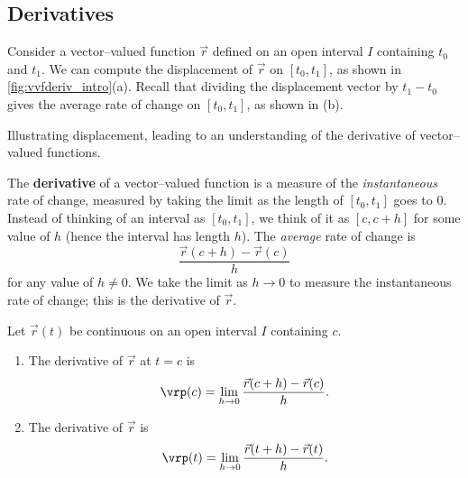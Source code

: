 \subsection*{Derivatives}

Consider a vector--valued function $\vec r$ defined on an open interval $I$ containing $t_0$ and $t_1$. We can compute the displacement of $\vec r$ on $[t_0,t_1]$, as shown in \autoref{fig:vvfderiv_intro}(a). Recall that dividing the displacement vector by $t_1-t_0$ gives the average rate of change on $[t_0,t_1]$, as shown in (b).

\begin{lxfigure}
\caption{Illustrating displacement, leading to an understanding of the derivative of vector--valued functions.}
\label{fig:vvfderiv_intro}
\end{lxfigure}

The \textbf{derivative} of a vector--valued function is a measure of the \emph{instantaneous} rate of change, measured by taking the limit as the length of $[t_0,t_1]$ goes to 0. Instead of thinking of an interval as $[t_0,t_1]$, we think of it as $[c,c+h]$ for some value of $h$ (hence the interval has length $h$).  The \emph{average} rate of change is 
$$\frac{\vec r(c+h)-\vec r(c)}{h}$$
for any value of $h\neq0$. We take the limit as $h\to0$ to measure the instantaneous rate of change; this is the derivative of $\vec r$.


{Let $\vec r(t)$ be continuous on an open interval $I$ containing $c$.
\begin{enumerate}
	\item The derivative of $\vec r$ at $t=c$ is
	$$ \vrp (c) = \lim_{h\to 0} \frac{\vec r(c+h) - \vec r(c)}{h}.$$
	\item	The derivative of $\vec r$ is
	$$ \vrp (t) = \lim_{h\to 0} \frac{\vec r(t+h) - \vec r(t)}{h}.$$
\end{enumerate}}


